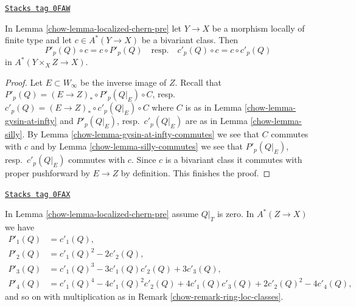 \begin{lemma}
\label{chow-lemma-homomorphism-commute}
\href{https://stacks.math.columbia.edu/tag/0FAW}{\texttt{Stacks tag 0FAW}}

In Lemma \ref{chow-lemma-localized-chern-pre} let $Y \to X$ be a morphism
locally of finite type and let $c \in A^*(Y \to X)$ be a bivariant class.
Then
$$
P'_p(Q) \circ c = c \circ P'_p(Q)
\quad\text{resp.}\quad
c'_p(Q) \circ c = c \circ c'_p(Q)
$$
in $A^*(Y \times_X Z \to X)$.
\end{lemma}

\begin{proof}

Let $E \subset W_\infty$ be the inverse image of $Z$.
Recall that $P'_p(Q) = (E \to Z)_* \circ P'_p(Q|_E) \circ C$,
resp.\ $c'_p(Q) = (E \to Z)_* \circ c'_p(Q|_E) \circ C$
where $C$ is as in Lemma \ref{chow-lemma-gysin-at-infty} and
$P'_p(Q|_E)$, resp.\ $c'_p(Q|_E)$ are as in
Lemma \ref{chow-lemma-silly}.
By Lemma \ref{chow-lemma-gysin-at-infty-commutes}
we see that $C$ commutes with $c$
and by Lemma \ref{chow-lemma-silly-commutes} we see that
$P'_p(Q|_E)$, resp.\ $c'_p(Q|_E)$ commutes with $c$.
Since $c$ is a bivariant class it commutes with proper
pushforward by $E \to Z$ by definition. This finishes the proof.
\end{proof}

\begin{lemma}
\label{chow-lemma-localized-chern-pre-compose}
\href{https://stacks.math.columbia.edu/tag/0FAX}{\texttt{Stacks tag 0FAX}}

In Lemma \ref{chow-lemma-localized-chern-pre} assume $Q|_T$ is zero. In
$A^*(Z \to X)$ we have
\begin{align*}
P'_1(Q) & = c'_1(Q), \\
P'_2(Q) & = c'_1(Q)^2 - 2c'_2(Q), \\
P'_3(Q) & = c'_1(Q)^3 - 3c'_1(Q)c'_2(Q) + 3c'_3(Q), \\
P'_4(Q) & = c'_1(Q)^4 - 4c'_1(Q)^2c'_2(Q) +
4c'_1(Q)c'_3(Q) + 2c'_2(Q)^2 - 4c'_4(Q),
\end{align*}
and so on with multiplication as in Remark \ref{chow-remark-ring-loc-classes}.
\end{lemma}

